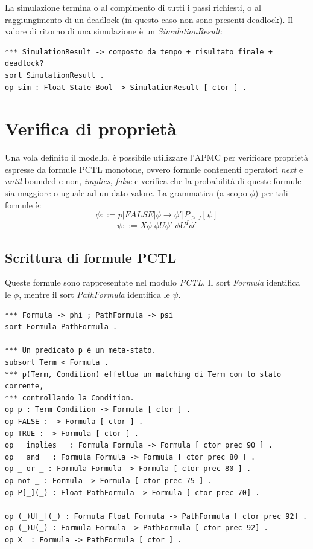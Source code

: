 La simulazione termina o al compimento di tutti i passi richiesti, o al
raggiungimento di un deadlock (in questo caso non sono presenti deadlock). Il
valore di ritorno di una simulazione è un \emph{SimulationResult}:
\begin{Verbatim}[fontsize=\small]
*** SimulationResult -> composto da tempo + risultato finale + deadlock?
sort SimulationResult .
op sim : Float State Bool -> SimulationResult [ ctor ] .
\end{Verbatim}

\section{Verifica di proprietà}

Una vola definito il modello, è possibile utilizzare l'APMC per verificare
proprietà espresse da formule PCTL monotone, ovvero formule contenenti operatori
\emph{next} e \emph{until} bounded e non, \emph{implies}, \emph{false} e
verifica che la probabilità di queste formule sia maggiore o uguale ad un dato
valore. La grammatica (a scopo $\phi$) per tali formule è:
 \[
\phi ::= p | FALSE | \phi \rightarrow \phi' | P_{\geq J}[\psi]
\]
\[
\psi ::= X \phi | \phi U \phi' | \phi U^I \phi'
\]

\subsection{Scrittura di formule PCTL}

Queste formule sono rappresentate nel modulo \emph{PCTL}. Il sort \emph{Formula}
identifica le $\phi$, mentre il sort \emph{PathFormula} identifica le $\psi$.
\begin{Verbatim}[fontsize=\small]
*** Formula -> phi ; PathFormula -> psi
sort Formula PathFormula .

*** Un predicato p è un meta-stato.
subsort Term < Formula .
*** p(Term, Condition) effettua un matching di Term con lo stato corrente,
*** controllando la Condition.
op p : Term Condition -> Formula [ ctor ] .
op FALSE : -> Formula [ ctor ] .
op TRUE : -> Formula [ ctor ] .
op _ implies _ : Formula Formula -> Formula [ ctor prec 90 ] .
op _ and _ : Formula Formula -> Formula [ ctor prec 80 ] .
op _ or _ : Formula Formula -> Formula [ ctor prec 80 ] .
op not _ : Formula -> Formula [ ctor prec 75 ] .
op P[_](_) : Float PathFormula -> Formula [ ctor prec 70] .

op (_)U[_](_) : Formula Float Formula -> PathFormula [ ctor prec 92] .
op (_)U(_) : Formula Formula -> PathFormula [ ctor prec 92] .
op X_ : Formula -> PathFormula [ ctor ] .
\end{Verbatim}

